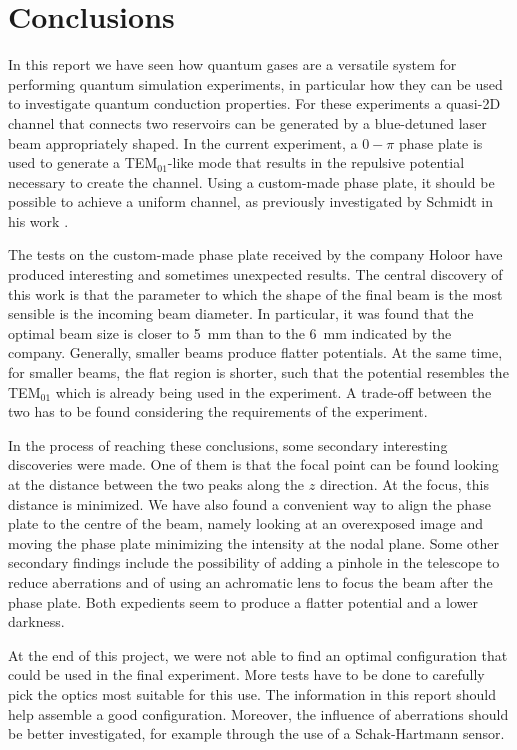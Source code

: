 \chapter{Conclusions}
In this report we have seen how quantum gases are a versatile system for performing quantum simulation experiments, in particular how they can be used to investigate quantum conduction properties. For these experiments a quasi-2D channel that connects two reservoirs can be generated by a blue-detuned laser beam appropriately shaped. In the current experiment, a $0-\pi$ phase plate is used to generate a TEM$_{01}$-like mode that results in the repulsive potential necessary to create the channel. Using a custom-made phase plate, it should be possible to achieve a uniform channel, as previously investigated by Schmidt in his work \cite{schmidt2021}.

The tests on the custom-made phase plate received by the company Holoor have produced interesting and sometimes unexpected results. The central discovery of this work is that the parameter to which the shape of the final beam is the most sensible is the incoming beam diameter. In particular, it was found that the optimal beam size is closer to \SI{5}{mm} than to the \SI{6}{mm} indicated by the company. Generally, smaller beams produce flatter potentials. At the same time, for smaller beams, the flat region is shorter, such that the potential resembles the TEM$_{01}$ which is already being used in the experiment. A trade-off between the two has to be found considering the requirements of the experiment.

In the process of reaching these conclusions, some secondary interesting discoveries were made. One of them is that the focal point can be found looking at the distance between the two peaks along the $z$ direction. At the focus, this distance is minimized. We have also found a convenient way to align the phase plate to the centre of the beam, namely looking at an overexposed image and moving the phase plate minimizing the intensity at the nodal plane. Some other secondary findings include the  possibility of adding a pinhole in the telescope to reduce aberrations and of using an achromatic lens to focus the beam after the phase plate. Both expedients seem to produce a flatter potential and a lower darkness.

At the end of this project, we were not able to find an optimal configuration that could be used in the final experiment. More tests have to be done to carefully pick the optics most suitable for this use. The information in this report should help assemble a good configuration. Moreover, the influence of aberrations should be better investigated, for example through the use of a Schak-Hartmann sensor.